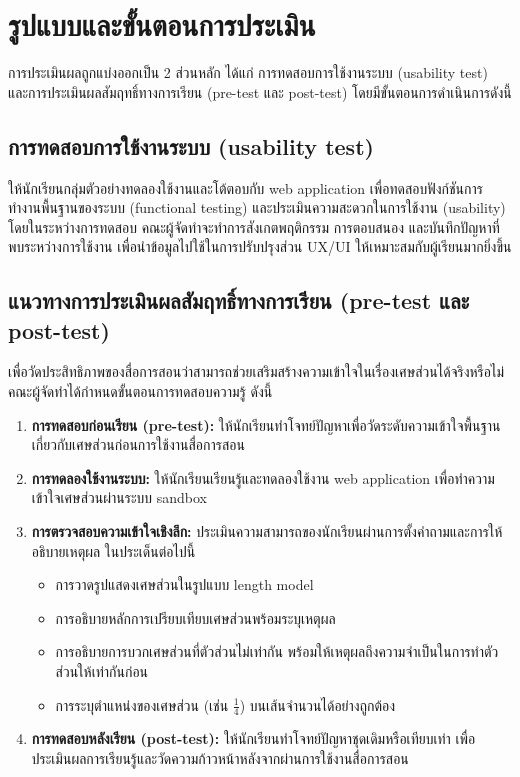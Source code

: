 \section{รูปแบบและขั้นตอนการประเมิน}
การประเมินผลถูกแบ่งออกเป็น 2 ส่วนหลัก ได้แก่ การทดสอบการใช้งานระบบ (usability test) และการประเมินผลสัมฤทธิ์ทางการเรียน (pre-test และ post-test) โดยมีขั้นตอนการดำเนินการดังนี้

\subsection{การทดสอบการใช้งานระบบ (usability test)}
ให้นักเรียนกลุ่มตัวอย่างทดลองใช้งานและโต้ตอบกับ web application เพื่อทดสอบฟังก์ชันการทำงานพื้นฐานของระบบ (functional testing) และประเมินความสะดวกในการใช้งาน (usability) โดยในระหว่างการทดสอบ 
คณะผู้จัดทำจะทำการสังเกตพฤติกรรม การตอบสนอง และบันทึกปัญหาที่พบระหว่างการใช้งาน เพื่อนำข้อมูลไปใช้ในการปรับปรุงส่วน UX/UI ให้เหมาะสมกับผู้เรียนมากยิ่งขึ้น

\subsection{แนวทางการประเมินผลสัมฤทธิ์ทางการเรียน (pre-test และ post-test)}
เพื่อวัดประสิทธิภาพของสื่อการสอนว่าสามารถช่วยเสริมสร้างความเข้าใจในเรื่องเศษส่วนได้จริงหรือไม่ คณะผู้จัดทำได้กำหนดขั้นตอนการทดสอบความรู้ ดังนี้
\begin{enumerate}
    \item \textbf{การทดสอบก่อนเรียน (pre-test):} ให้นักเรียนทำโจทย์ปัญหาเพื่อวัดระดับความเข้าใจพื้นฐานเกี่ยวกับเศษส่วนก่อนการใช้งานสื่อการสอน
    \item \textbf{การทดลองใช้งานระบบ:} ให้นักเรียนเรียนรู้และทดลองใช้งาน web application เพื่อทำความเข้าใจเศษส่วนผ่านระบบ sandbox
    \item \textbf{การตรวจสอบความเข้าใจเชิงลึก:} ประเมินความสามารถของนักเรียนผ่านการตั้งคำถามและการให้อธิบายเหตุผล ในประเด็นต่อไปนี้
        \begin{itemize}
            \item การวาดรูปแสดงเศษส่วนในรูปแบบ length model
            \item การอธิบายหลักการเปรียบเทียบเศษส่วนพร้อมระบุเหตุผล
            \item การอธิบายการบวกเศษส่วนที่ตัวส่วนไม่เท่ากัน พร้อมให้เหตุผลถึงความจำเป็นในการทำตัวส่วนให้เท่ากันก่อน
            \item การระบุตำแหน่งของเศษส่วน (เช่น $\frac{1}{4}$) บนเส้นจำนวนได้อย่างถูกต้อง
        \end{itemize}
    \item \textbf{การทดสอบหลังเรียน (post-test):} ให้นักเรียนทำโจทย์ปัญหาชุดเดิมหรือเทียบเท่า เพื่อประเมินผลการเรียนรู้และวัดความก้าวหน้าหลังจากผ่านการใช้งานสื่อการสอน
\end{enumerate}

